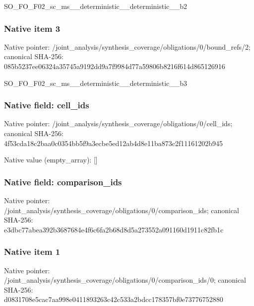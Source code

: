 \documentclass[10pt,a4paper]{article}
\begin{document}
\begingroup\raggedright\sloppy SO\_\allowbreak{}FO\_\allowbreak{}F02\_\allowbreak{}sc\_\allowbreak{}ms\_\allowbreak{}\_\allowbreak{}deterministic\_\allowbreak{}\_\allowbreak{}deterministic\_\allowbreak{}\_\allowbreak{}b2\par\endgroup

\subsubsection{Native item 3}
Native pointer: /joint\_\allowbreak{}analysis/synthesis\_\allowbreak{}coverage/obligations/0/bound\_\allowbreak{}refs/2; canonical SHA-256: 085b5237ee06324a35745a9192dd9a7f9984d77a59806b8216f614d865126916

\begingroup\raggedright\sloppy SO\_\allowbreak{}FO\_\allowbreak{}F02\_\allowbreak{}sc\_\allowbreak{}ms\_\allowbreak{}\_\allowbreak{}deterministic\_\allowbreak{}\_\allowbreak{}deterministic\_\allowbreak{}\_\allowbreak{}b3\par\endgroup

\subsubsection{Native field: cell\_\allowbreak{}ids}
Native pointer: /joint\_\allowbreak{}analysis/synthesis\_\allowbreak{}coverage/obligations/0/cell\_\allowbreak{}ids; canonical SHA-256: 4f53cda18c2baa0c0354bb5f9a3ecbe5ed12ab4d8e11ba873c2f11161202b945

Native value (empty\_\allowbreak{}array): []

\subsubsection{Native field: comparison\_\allowbreak{}ids}
Native pointer: /joint\_\allowbreak{}analysis/synthesis\_\allowbreak{}coverage/obligations/0/comparison\_\allowbreak{}ids; canonical SHA-256: e3dbc77abea392b3687684e4f6c6fa2b68d8d5a273552a091160d1911c82fb1c

\subsubsection{Native item 1}
Native pointer: /joint\_\allowbreak{}analysis/synthesis\_\allowbreak{}coverage/obligations/0/comparison\_\allowbreak{}ids/0; canonical SHA-256: d0831708e5cac7aa998e0411893263c42c533a2bdcc178357bf0e73776752880
\end{document}
